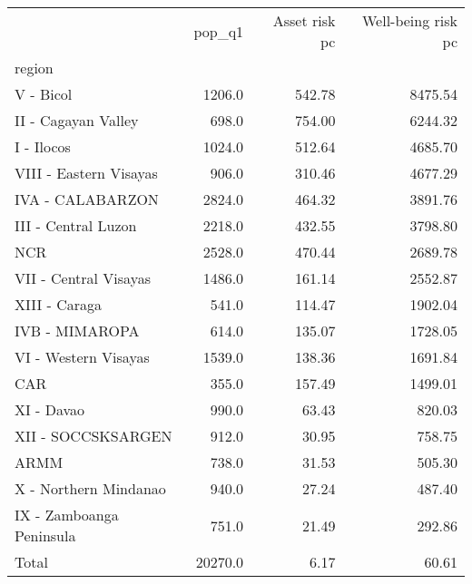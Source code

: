\begin{tabular}{lrrr}
\toprule
{} &   pop\_q1 &  Asset risk pc &  Well-being risk pc \\
region                   &          &                &                     \\
\midrule
V - Bicol                &   1206.0 &         542.78 &             8475.54 \\
II - Cagayan Valley      &    698.0 &         754.00 &             6244.32 \\
I - Ilocos               &   1024.0 &         512.64 &             4685.70 \\
VIII - Eastern Visayas   &    906.0 &         310.46 &             4677.29 \\
IVA - CALABARZON         &   2824.0 &         464.32 &             3891.76 \\
III - Central Luzon      &   2218.0 &         432.55 &             3798.80 \\
NCR                      &   2528.0 &         470.44 &             2689.78 \\
VII - Central Visayas    &   1486.0 &         161.14 &             2552.87 \\
XIII - Caraga            &    541.0 &         114.47 &             1902.04 \\
IVB - MIMAROPA           &    614.0 &         135.07 &             1728.05 \\
VI - Western Visayas     &   1539.0 &         138.36 &             1691.84 \\
CAR                      &    355.0 &         157.49 &             1499.01 \\
XI - Davao               &    990.0 &          63.43 &              820.03 \\
XII - SOCCSKSARGEN       &    912.0 &          30.95 &              758.75 \\
ARMM                     &    738.0 &          31.53 &              505.30 \\
X - Northern Mindanao    &    940.0 &          27.24 &              487.40 \\
IX - Zamboanga Peninsula &    751.0 &          21.49 &              292.86 \\
Total                    &  20270.0 &           6.17 &               60.61 \\
\bottomrule
\end{tabular}
